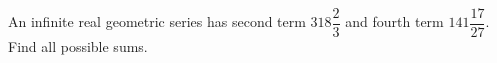 An infinite real geometric series has second term $318\dfrac{2}{3}$ and fourth term $141\dfrac{17}{27}$. Find all possible sums.
